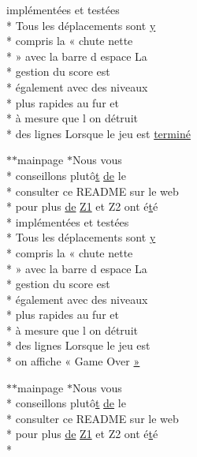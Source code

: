 \begin{DoxyCompactItemize}
implémentées et testées \\*
Tous les déplacements sont \hyperlink{gl_8h_a74d80fd479c0f6d0153c709949a089ef}{y} \\*
compris la « chute nette \\*
» avec la barre d espace La \\*
gestion du score est \\*
également avec des niveaux \\*
plus rapides au fur et \\*
à mesure que l on détruit \\*
des lignes Lorsque le jeu est \hyperlink{mainpage_8dox_a0fd57feadaeea49ac1896789ee89e994}{terminé}
\item 
$\ast$$\ast$mainpage $\ast$Nous vous \\*
conseillons plutô\hyperlink{gl_8h_a00140d6f5c548b26daf170bf16e86a6d}{t} \hyperlink{mainpage_8dox_ab37fa35e77d95c6d0d0ab620c97c3db8}{de} le \\*
consulter ce R\-E\-A\-D\-M\-E sur le web \\*
pour plus \hyperlink{mainpage_8dox_ab37fa35e77d95c6d0d0ab620c97c3db8}{de} \hyperlink{mainpage_8dox_ac1b4262bdb6c0693bc375775d6cfa421}{Z1} et Z2 ont é\hyperlink{gl_8h_a00140d6f5c548b26daf170bf16e86a6d}{t}é \\*
implémentées et testées \\*
Tous les déplacements sont \hyperlink{gl_8h_a74d80fd479c0f6d0153c709949a089ef}{y} \\*
compris la « chute nette \\*
» avec la barre d espace La \\*
gestion du score est \\*
également avec des niveaux \\*
plus rapides au fur et \\*
à mesure que l on détruit \\*
des lignes Lorsque le jeu est \\*
on affiche « Game Over \hyperlink{mainpage_8dox_a1df7d96626b3d93110ef592c4d7488c4}{»}
\item 
$\ast$$\ast$mainpage $\ast$Nous vous \\*
conseillons plutô\hyperlink{gl_8h_a00140d6f5c548b26daf170bf16e86a6d}{t} \hyperlink{mainpage_8dox_ab37fa35e77d95c6d0d0ab620c97c3db8}{de} le \\*
consulter ce R\-E\-A\-D\-M\-E sur le web \\*
pour plus \hyperlink{mainpage_8dox_ab37fa35e77d95c6d0d0ab620c97c3db8}{de} \hyperlink{mainpage_8dox_ac1b4262bdb6c0693bc375775d6cfa421}{Z1} et Z2 ont é\hyperlink{gl_8h_a00140d6f5c548b26daf170bf16e86a6d}{t}é \\*

\end{DoxyCompactItemize}
